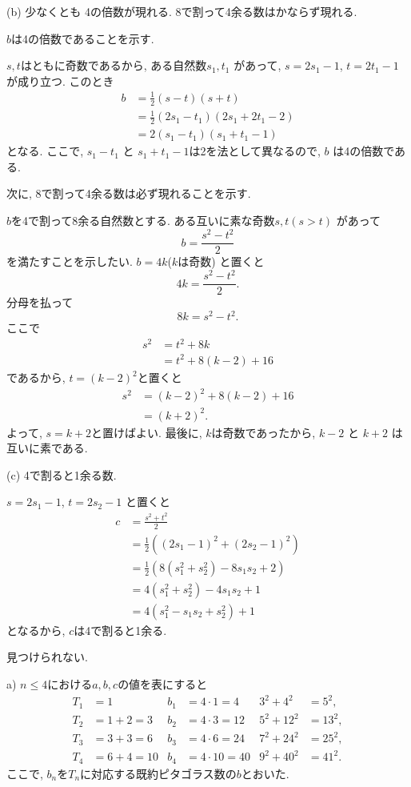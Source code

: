 (b) 少なくとも 4の倍数が現れる. 8で割って4余る数はかならず現れる.

$b$は4の倍数であることを示す.

$s, t$はともに奇数であるから, ある自然数$s_1, t_1$ があって, $s = 2s_1 - 1$, $t = 2t_1 - 1$
が成り立つ.
このとき
\begin{align*}
b
  &= \frac{1}{2}(s - t)(s + t) \\
  &= \frac{1}{2}(2s_1 - t_1)(2s_1 + 2t_1 - 2) \\
  &= 2(s_1 - t_1)(s_1 + t_1 - 1)
\end{align*}
となる.
ここで, $s_1 - t_1$ と $s_1 + t_1 - 1$は2を法として異なるので, $b$ は4の倍数である.

次に, 8で割って4余る数は必ず現れることを示す.

$b$を4で割って8余る自然数とする. ある互いに素な奇数$s, t (s > t)$ があって
\[
  b = \frac{s^2 - t^2}{2}
\]
を満たすことを示したい.
$b = 4k$($k$は奇数) と置くと
\[
  4k = \frac{s^2 - t^2}{2}.
\]
分母を払って
\[
  8k = s^2 - t^2.
\]
ここで
\begin{align*}
s^2
  &= t^2 + 8k \\
  &= t^2 + 8(k-2) + 16
\end{align*}
であるから, $t = (k-2)^2$と置くと
\begin{align*}
  s^2
    &= (k-2)^2 + 8(k-2) + 16 \\
    &= (k + 2)^2.
\end{align*}
よって, $s = k + 2$と置けばよい.
最後に, $k$は奇数であったから, $k-2$ と $k+2$ は互いに素である.

(c) 4で割ると1余る数.

$s = 2s_1 - 1$, $t = 2s_2 - 1$ と置くと
\begin{align*}
c
  &= \frac{s^2 + t^2}{2} \\
  &= \frac{1}{2} ((2s_1 - 1)^2 + (2s_2 - 1)^2) \\
  &= \frac{1}{2} (8(s_1^2 + s_2^2) - 8s_1s_2 + 2) \\
  &= 4(s_1^2 + s_2^2) - 4s_1s_2 + 1 \\
  &= 4(s_1^2 - s_1s_2 + s_2^2) + 1
\end{align*}
となるから, $c$は4で割ると1余る.

見つけられない. %

\noindent a) %
$n \le 4$における$a, b, c$の値を表にすると
\begin{align*}
T_1 & = 1         & b_1 &= 4 \cdot 1  = 4 & 3^2 + 4^2  &= 5^2, \\
T_2 & = 1 + 2 = 3 & b_2 &= 4 \cdot 3 = 12 & 5^2 + 12^2 &=13^2, \\
T_3 & = 3 + 3 = 6 & b_3 &= 4 \cdot 6 = 24 & 7^2 + 24^2 &= 25^2, \\
T_4 & = 6 + 4 = 10 & b_4 &= 4 \cdot 10 = 40 & 9^2 + 40^2 &= 41^2.
\end{align*}
ここで, $b_n$を$T_n$に対応する既約ピタゴラス数の$b$とおいた.


